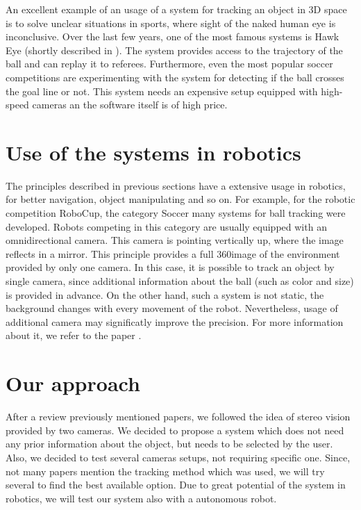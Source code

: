 An excellent example of an usage of a system for tracking an object in 3D space
is to solve unclear situations in sports, where sight of the naked human
eye is inconclusive. Over the last few years, one of the most famous systems is
Hawk Eye (shortly described in \citet*{owens2003hawk}). The system provides
access to the trajectory of the ball and can replay it to referees.
Furthermore, even the most popular soccer competitions are experimenting with
the system for detecting if the ball crosses the goal line or not.  This system needs
an expensive setup equipped with high-speed cameras an the software itself is of
high price.

\section{Use of the systems in robotics}

The principles described in previous sections have a extensive usage in
robotics, for better navigation, object manipulating and so on. For example,
for the robotic competition
RoboCup, the category Soccer many systems for ball tracking were developed. Robots
competing in this category are usually equipped with an omnidirectional camera.
This camera is pointing vertically up, where the image reflects in a mirror.
This principle provides a full 360\degree image of the environment provided by
only one camera. In this case, it is possible to track an object by single
camera, since additional information about the ball (such as color and size)
is provided in advance. On the other hand, such a system is not static, the
background changes with every movement of the robot. Nevertheless, usage of
additional camera may significatly improve the precision. For more information
about it, we refer to the paper \citet*{kappeler20103d}.

\section{Our approach}

After a review previously mentioned papers, we followed the idea of stereo
vision provided by two cameras. We decided to propose a system which does not
need any prior information about the object, but needs to be selected by the
user. Also, we decided to test several cameras setups, not requiring specific
one. Since, not many papers mention the tracking method which was used, we will
try several to find the best available option. Due to great potential of the
system in robotics, we will test our system also with a autonomous robot.
